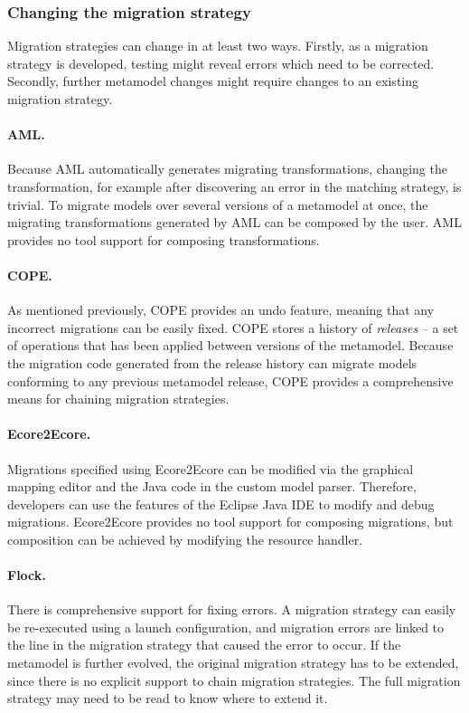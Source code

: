 \subsubsection{Changing the migration strategy}
Migration strategies can change in at least two ways. Firstly, as a migration strategy is developed, testing might reveal errors which need to be corrected. Secondly, further metamodel changes might require changes to an existing migration strategy.

\paragraph{AML.}  Because AML automatically generates migrating transformations, changing the transformation, for example after discovering an error in the matching strategy, is trivial. To migrate models over several versions of a metamodel at once, the migrating transformations generated by AML can be composed by the user. AML provides no tool support for composing transformations.

\paragraph{COPE.} As mentioned previously, COPE provides an undo feature,
meaning that any incorrect migrations can be easily fixed. COPE stores a history of \emph{releases} -- a set of operations that has been applied between versions of the metamodel. Because the migration code generated from the release history can migrate models conforming to any previous metamodel release, COPE provides a comprehensive means for chaining migration strategies. 

\paragraph{Ecore2Ecore.} Migrations specified using Ecore2Ecore can be modified via the graphical mapping editor and the Java code in the custom model parser. Therefore, developers can use the features of the Eclipse Java IDE to modify and debug migrations. Ecore2Ecore provides no tool support for composing migrations, but composition can be achieved by modifying the resource handler.

\paragraph{Flock.} There is comprehensive support for fixing errors. A migration strategy can easily be re-executed using a launch configuration, and migration errors are linked to the line in the migration strategy that caused the error to occur. If the metamodel is further evolved, the original migration strategy has to be extended, since there is no explicit support to chain migration strategies. The full migration strategy may need to be read to know where to extend it.


